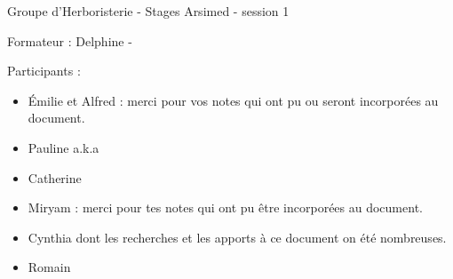 Groupe d'Herboristerie - Stages Arsimed - session 1

Formateur : Delphine - 

Participants : 
\begin{multicols}{3}
    \begin{itemize}[label = \faPen]
        \item \'Emilie et Alfred : merci pour vos notes qui ont pu ou seront incorporées au document.
        \item Pauline a.k.a 
        \item Catherine
        \item Miryam : merci pour tes notes qui ont pu être incorporées au document.
        \item Cynthia dont les recherches et les apports à ce document on été nombreuses.
        \item Romain
    \end{itemize}
\end{multicols}

